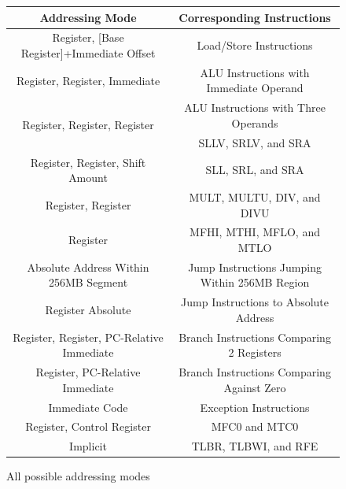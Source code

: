 \documentclass[oneside]{book}
\begin{document}
\begin{figure}[H]
\begin{center}
\resizebox{0.9\textwidth}{!} {
\begin{tabular}{|c|c|}

\hline \textbf{Addressing Mode} &
       \textbf{Corresponding Instructions} \\

\hline Register, [Base Register]+Immediate Offset &
       Load/Store Instructions \\

\hline Register, Register, Immediate &
       ALU Instructions with Immediate Operand \\

\hline \multirow{2}{*}{Register, Register, Register} &
       ALU Instructions with Three Operands \\
\cline{2-2} & SLLV, SRLV, and SRA \\

\hline Register, Register, Shift Amount &
       SLL, SRL, and SRA \\

\hline Register, Register &
       MULT, MULTU, DIV, and DIVU \\

\hline Register &
       MFHI, MTHI, MFLO, and MTLO \\

\hline Absolute Address Within 256MB Segment &
       Jump Instructions Jumping Within 256MB Region \\

\hline Register Absolute &
       Jump Instructions to Absolute Address \\

\hline Register, Register, PC-Relative Immediate &
       Branch Instructions Comparing 2 Registers \\

\hline Register, PC-Relative Immediate &
       Branch Instructions Comparing Against Zero \\

\hline Immediate Code &
       Exception Instructions \\

\hline Register, Control Register &
       MFC0 and MTC0 \\

\hline Implicit &
       TLBR, TLBWI, and RFE \\

\hline

\end{tabular}
}
\end{center}
\caption{All possible addressing modes}
\label{addrmodes}
\end{figure}
\end{document}
